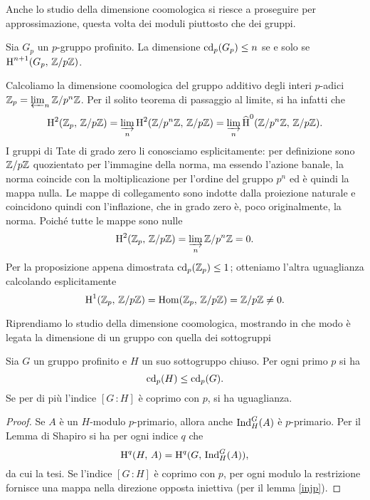 Anche lo studio della dimensione coomologica si riesce a proseguire per approssimazione, questa volta dei moduli piuttosto che dei gruppi.

\begin{proposition}
	Sia $ G_p $ un $ p $-gruppo profinito. La dimensione $ \operatorname{cd}_p(G_p) \leq n $ se e solo se $ \operatorname{H}^{n+1}(G_p, \, \mathbb{Z}/p\mathbb{Z}) $. \todo[dimostrare]
\end{proposition}

Calcoliamo la dimensione coomologica del gruppo additivo degli interi $ p $-adici $ \mathbb{Z}_p = \varprojlim_n \mathbb{Z}/p^n\mathbb{Z} $. Per il solito teorema di passaggio al limite, si ha infatti che 
\[ \operatorname{H}^2(\mathbb{Z}_p , \, \mathbb{Z}/p\mathbb{Z}) = \varinjlim_n \operatorname{H}^2(\mathbb{Z}/p^n\mathbb{Z}, \, \mathbb{Z}/p\mathbb{Z}) = \varinjlim_n \operatorname{\widehat{H}}^0(\mathbb{Z}/p^n\mathbb{Z}, \, \mathbb{Z}/p\mathbb{Z}). \]
I gruppi di Tate di grado zero li conosciamo esplicitamente: per definizione sono $ \mathbb{Z}/p\mathbb{Z} $ quozientato per l'immagine della norma, ma essendo l'azione banale, la norma coincide con la moltiplicazione per l'ordine del gruppo $ p^n $ ed è quindi la mappa nulla. Le mappe di collegamento sono indotte dalla proiezione naturale e coincidono quindi con l'inflazione, che in grado zero è, poco originalmente, la norma. Poiché tutte le mappe sono nulle
\[ \operatorname{H}^2(\mathbb{Z}_p , \, \mathbb{Z}/p\mathbb{Z}) = \varinjlim_n \mathbb{Z}/p^n\mathbb{Z} = 0. \]
Per la proposizione appena dimostrata $ \operatorname{cd}_p(\mathbb{Z}_p) \leq 1 $; otteniamo l'altra uguaglianza calcolando esplicitamente $$  \operatorname{H}^1(\mathbb{Z}_p , \, \mathbb{Z}/p\mathbb{Z}) = \operatorname{Hom}(\mathbb{Z}_p , \, \mathbb{Z}/p\mathbb{Z}) = \mathbb{Z}/p\mathbb{Z} \neq 0.  $$

Riprendiamo lo studio della dimensione coomologica, mostrando in che modo è legata la dimensione di un gruppo con quella dei sottogruppi

\begin{proposition}
	Sia $ G $ un gruppo profinito e $ H $ un suo sottogruppo chiuso. Per ogni primo $ p $ si ha
	\[ \operatorname{cd}_p(H) \leq \operatorname{cd}_p(G). \]
	Se per di più l'indice $ [G\,\colon H] $ è coprimo con $ p $, si ha uguaglianza.
\end{proposition}
\begin{proof}
	Se $ A $ è un $ H $-modulo $ p $-primario, allora anche $ \operatorname{Ind}_H^G(A) $ è $ p $-primario. Per il Lemma di Shapiro si ha per ogni indice $ q $ che
	\[ \operatorname{H}^q(H, \, A) = \operatorname{H}^q(G, \, \operatorname{Ind}_H^G(A)),  \]
	da cui la tesi. Se l'indice $ [G\,\colon H] $ è coprimo con $ p $, per ogni modulo la restrizione fornisce una mappa nella direzione opposta iniettiva (per il lemma \ref{injp}).
\end{proof}

